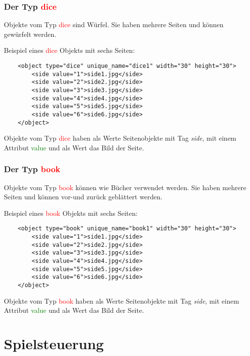 \documentclass{scrbook}
\newcommand{\dice}{\textcolor{red}{dice}\xspace}
\newcommand{\book}{\textcolor{red}{book}\xspace}
\newcommand{\xmlattribute}[1]{\textcolor{green}{#1}}
\begin{document}
	\subsection{Der Typ \dice}
	Objekte vom Typ \dice sind Würfel. Sie haben mehrere Seiten und können gewürfelt werden.

	Beispiel eines \dice Objekts mit sechs Seiten:
	
	\lstset{language=XML}
	\begin{lstlisting}	
	<object type="dice" unique_name="dice1" width="30" height="30">
		<side value="1">side1.jpg</side>
		<side value="2">side2.jpg</side>
		<side value="3">side3.jpg</side>
		<side value="4">side4.jpg</side>
		<side value="5">side5.jpg</side>
		<side value="6">side6.jpg</side>
	</object>
	\end{lstlisting}
	
	Objekte vom Typ \dice haben als Werte Seitenobjekte mit Tag \textit{side}, mit einem Attribut \xmlattribute{value} und als Wert das Bild der Seite.

	\subsection{Der Typ \book}
	Objekte vom Typ \book können wie Bücher verwendet werden. Sie haben mehrere Seiten und können vor-und zurück geblättert werden.
	
	Beispiel eines \book Objekts mit sechs Seiten:
	
	\lstset{language=XML}
	\begin{lstlisting}	
	<object type="book" unique_name="book1" width="30" height="30">
		<side value="1">side1.jpg</side>
		<side value="2">side2.jpg</side>
		<side value="3">side3.jpg</side>
		<side value="4">side4.jpg</side>
		<side value="5">side5.jpg</side>
		<side value="6">side6.jpg</side>
	</object>
	\end{lstlisting}
	
	Objekte vom Typ \book haben als Werte Seitenobjekte mit Tag \textit{side}, mit einem Attribut \xmlattribute{value} und als Wert das Bild der Seite.


	\chapter{Spielsteuerung}
\end{document}
